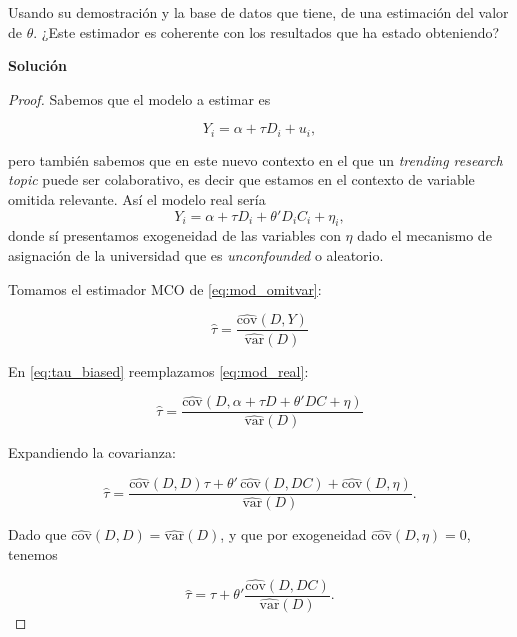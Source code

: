\documentclass[a4paper, answers, addpoints, 11pt]{exam}
\newenvironment{solucion}{%
  \begin{mdframed}[
    backgroundcolor=blue!5,    %
    linecolor=blue!50,          %
    linewidth=2pt,              %
    leftmargin=10pt,            %
    rightmargin=8pt,           %
    topline=true,              %
    bottomline=true,            %
    roundcorner=10pt,           %
    innerleftmargin=10pt,       %
    innerrightmargin=10pt,      %
    innerbottommargin=10pt,     %
    innertopmargin=10pt         %
  ]%
  \begin{tcolorbox}[colframe=blue!50!black, colback=blue!50, coltitle=white, sharp corners=all, boxrule=1mm, width=\textwidth, halign=left, valign=center, top=0mm, bottom=0mm, left=0mm, right=0mm] \textbf{Solución} \end{tcolorbox} }{\end{mdframed}}
\newcommand{\sVar}{\widehat{\mathrm{var}}}
\newcommand{\sCov}{\widehat{\mathrm{cov}}}
\begin{document}
\begin{itemize}
    Usando su demostración y la base de datos que tiene, de una estimación del valor de $\theta$. ¿Este estimador es coherente con los resultados que ha estado obteniendo?
    
\begin{solucion}
     \begin{proof}
         
    Sabemos que el modelo a estimar es 
    
    \begin{equation}
    Y_i = \alpha + \tau D_i + u_i \label{eq:mod_omitvar},
    \end{equation}

    pero también sabemos que en este nuevo contexto en el que un \textit{trending research topic} puede ser colaborativo, es decir que estamos en el contexto de variable omitida relevante. Así el modelo real sería
    \begin{equation}
    Y_i = \alpha + \tau D_i + \theta' D_i C_i + \eta_i \label{eq:mod_real},
    \end{equation}
    donde sí presentamos exogeneidad de las variables con $\eta$ dado el mecanismo de asignación de la universidad que es \textit{unconfounded} o aleatorio. 
    
    Tomamos el estimador MCO de \ref{eq:mod_omitvar}:
    
    \begin{equation}
    \hat{\tau} = \frac{\sCov(D,Y)}{\sVar(D)} \label{eq:tau_biased}
    \end{equation}
    
    En \ref{eq:tau_biased} reemplazamos \ref{eq:mod_real}:
    
    \begin{equation}
    \hat{\tau} = \frac{\sCov(D, \alpha + \tau D + \theta' D C + \eta)}{\sVar(D)}
    \end{equation}
    
    Expandiendo la covarianza:
    
    \begin{equation}
    \hat{\tau} = \frac{\sCov(D, D) \tau + \theta'\, \sCov(D, DC) + \sCov(D, \eta)}{\sVar(D)}.
    \end{equation}
    
    Dado que $\sCov(D,D) = \sVar(D)$, y que por exogeneidad $\sCov (D,\eta)=0$, tenemos
    
    \begin{equation}
    \hat{\tau} = \tau + \theta' \frac{\sCov (D, DC)}{\sVar(D)}.
    \end{equation}
    

\end{proof}
\end{solucion}
\end{itemize}
\end{document}
